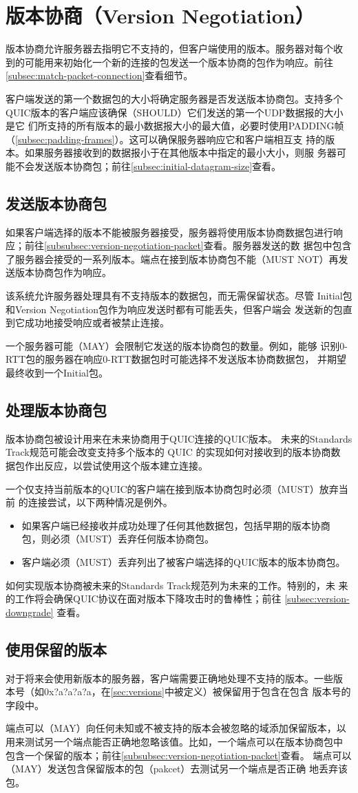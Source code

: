\section{版本协商（Version Negotiation）}
版本协商允许服务器去指明它不支持的，但客户端使用的版本。服务器对每个收
到的可能用来初始化一个新的连接的包发送一个版本协商的包作为响应。前往
\ref{subsec:match-packet-connection}查看细节。

客户端发送的第一个数据包的大小将确定服务器是否发送版本协商包。支持多个
QUIC版本的客户端应该确保（SHOULD）它们发送的第一个UDP数据报的大小是它
们所支持的所有版本的最小数据报大小的最大值，必要时使用PADDING帧
（\ref{subsec:padding-frames}）。这可以确保服务器响应它和客户端相互支
持的版本。如果服务器接收到的数据报小于在其他版本中指定的最小大小，则服
务器可能不会发送版本协商包；前往\ref{subsec:initial-datagram-size}查看。

\subsection{发送版本协商包}
如果客户端选择的版本不能被服务器接受，服务器将使用版本协商数据包进行响
应；前往\ref{subsubsec:version-negotiation-packet}查看。服务器发送的数
据包中包含了服务器会接受的一系列版本。端点在接到版本协商包不能（MUST
NOT）再发送版本协商包作为响应。

该系统允许服务器处理具有不支持版本的数据包，而无需保留状态。尽管
Initial包和Version Negotiation包作为响应发送时都有可能丢失，但客户端会 
发送新的包直到它成功地接受响应或者被禁止连接。

一个服务器可能（MAY）会限制它发送的版本协商包的数量。例如，能够
识别0-RTT包的服务器在响应0-RTT数据包时可能选择不发送版本协商数据包，
并期望最终收到一个Initial包。

\subsection{处理版本协商包}
版本协商包被设计用来在未来协商用于QUIC连接的QUIC版本。 未来的Standards
Track规范可能会改变支持多个版本的 QUIC 的实现如何对接收到的版本协商数
据包作出反应，以尝试使用这个版本建立连接。

一个仅支持当前版本的QUIC的客户端在接到版本协商包时必须（MUST）放弃当前
的连接尝试，以下两种情况是例外。

\begin{itemize}
\item 如果客户端已经接收并成功处理了任何其他数据包，包括早期的版本协商
  包，则必须（MUST）丢弃任何版本协商包。
\item 客户端必须（MUST）丢弃列出了被客户端选择的QUIC版本的版本协商包。
\end{itemize}
如何实现版本协商被未来的Standards Track规范列为未来的工作。特别的，未
来的工作将会确保QUIC协议在面对版本下降攻击时的鲁棒性；前往
\ref{subsec:version-downgrade} 查看。

\subsection{使用保留的版本}
对于将来会使用新版本的服务器，客户端需要正确地处理不支持的版本。一些版
本号（如0x?a?a?a?a，在\ref{sec:versions}中被定义）被保留用于包含在包含
版本号的字段中。

端点可以（MAY）向任何未知或不被支持的版本会被忽略的域添加保留版本，以
用来测试另一个端点能否正确地忽略该值。比如，一个端点可以在版本协商包中
包含一个保留的版本；前往\ref{subsubsec:version-negotiation-packet}查看。
端点可以（MAY）发送包含保留版本的包（pakcet）去测试另一个端点是否正确
地丢弃该包。